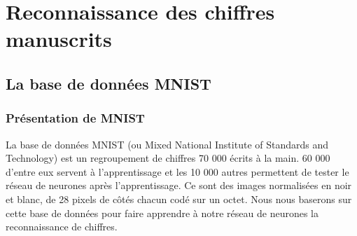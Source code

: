 \chapter{Reconnaissance des chiffres manuscrits}

\section{La base de données MNIST}

\subsection{Présentation de MNIST}
La base de données MNIST (ou Mixed National Institute of Standards and Technology) est un regroupement de chiffres 70 000 écrits à la main. 60 000 d'entre eux servent à l'apprentissage et les 10 000 autres permettent de tester le réseau de neurones après l'apprentissage. Ce sont des images normalisées en noir et blanc, de 28 pixels de côtés chacun codé sur un octet. Nous nous baserons sur cette base de données pour faire apprendre à notre réseau de neurones la reconnaissance de chiffres.


